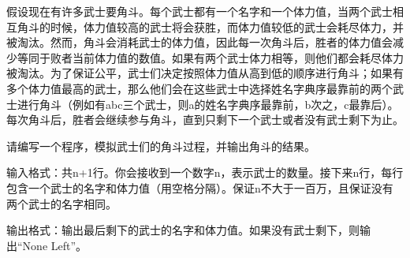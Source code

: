 \begin{example}
  假设现在有许多武士要角斗。每个武士都有一个名字和一个体力值，当两个武士相互角斗的时候，体力值较高的武士将会获胜，而体力值较低的武士会耗尽体力，并被淘汰。然而，角斗会消耗武士的体力值，因此每一次角斗后，胜者的体力值会减少等同于败者当前体力值的数值。如果有两个武士体力相等，则他们都会耗尽体力被淘汰。为了保证公平，武士们决定按照体力值从高到低的顺序进行角斗；如果有多个体力值最高的武士，那么他们会在这些武士中选择姓名字典序最靠前的两个武士进行角斗（例如有abc三个武士，则a的姓名字典序最靠前，b次之，c最靠后）。每次角斗后，胜者会继续参与角斗，直到只剩下一个武士或者没有武士剩下为止。

  请编写一个程序，模拟武士们的角斗过程，并输出角斗的结果。

  输入格式：共n+1行。你会接收到一个数字n，表示武士的数量。接下来n行，每行包含一个武士的名字和体力值（用空格分隔）。保证n不大于一百万，且保证没有两个武士的名字相同。

  输出格式：输出最后剩下的武士的名字和体力值。如果没有武士剩下，则输出“None Left”。
\end{example}

